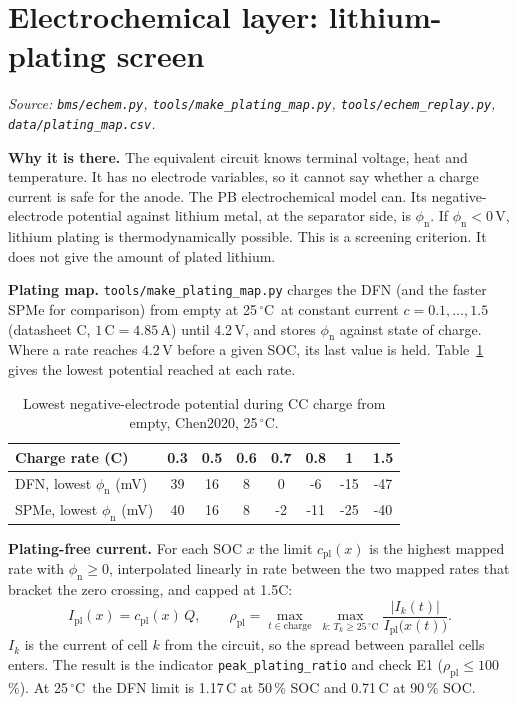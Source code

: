 \documentclass[11pt,a4paper]{article}
\newcommand{\degC}{\ensuremath{{}^{\circ}\mathrm{C}}}
\begin{document}
\section{Electrochemical layer: lithium-plating screen}\label{sec:echem}
{\sloppy\emph{Source: \texttt{bms/echem.py}, \texttt{tools/make\_plating\_map.py}, \texttt{tools/echem\_replay.py}, \texttt{data/plating\_map.csv}.}}

\textbf{Why it is there.} The equivalent circuit knows terminal voltage, heat and temperature. It has no electrode variables, so it cannot say whether a charge current is safe for the anode. The PB electrochemical model can. Its negative-electrode potential against lithium metal, at the separator side, is $\phi_{\mathrm{n}}$. If $\phi_{\mathrm{n}}<0$\,V, lithium plating is thermodynamically possible. This is a screening criterion. It does not give the amount of plated lithium.

\textbf{Plating map.} \texttt{tools/make\_plating\_map.py} charges the DFN (and the faster SPMe for comparison) from empty at 25\,\degC\ at constant current $c=0.1,\dots,1.5$ (datasheet C, $1\,\mathrm{C}=4.85$\,A) until 4.2\,V, and stores $\phi_{\mathrm{n}}$ against state of charge. Where a rate reaches 4.2\,V before a given SOC, its last value is held. Table~\ref{tab:plmap} gives the lowest potential reached at each rate.
\begin{table}[H]
\centering\small
\begin{tabular}{@{}lccccccc@{}}
\toprule
Charge rate (C) & 0.3 & 0.5 & 0.6 & 0.7 & 0.8 & 1 & 1.5 \\
\midrule
DFN, lowest $\phi_{\mathrm{n}}$ (mV) & 39 & 16 & 8 & 0 & -6 & -15 & -47 \\
SPMe, lowest $\phi_{\mathrm{n}}$ (mV) & 40 & 16 & 8 & -2 & -11 & -25 & -40 \\
\bottomrule
\end{tabular}
\caption{Lowest negative-electrode potential during CC charge from empty, Chen2020, 25\,\degC.}\label{tab:plmap}
\end{table}

\textbf{Plating-free current.} For each SOC $x$ the limit $c_{\mathrm{pl}}(x)$ is the highest mapped rate with $\phi_{\mathrm{n}}\ge 0$, interpolated linearly in rate between the two mapped rates that bracket the zero crossing, and capped at 1.5C:
\begin{equation}
I_{\mathrm{pl}}(x)=c_{\mathrm{pl}}(x)\,Q,\qquad
\rho_{\mathrm{pl}}=\max_{t\in\text{charge}}\ \max_{k:\,T_k\ge 25\,\degC}\frac{|I_k(t)|}{I_{\mathrm{pl}}\big(x(t)\big)} .
\end{equation}
$I_k$ is the current of cell $k$ from the circuit, so the spread between parallel cells enters. The result is the indicator \texttt{peak\_plating\_ratio} and check E1 ($\rho_{\mathrm{pl}}\le 100$\,\%). At 25\,\degC\ the DFN limit is 1.17\,C at 50\,\% SOC and 0.71\,C at 90\,\% SOC.
\end{document}
